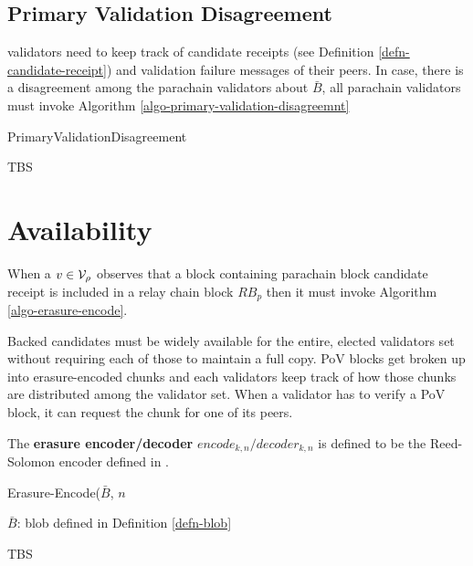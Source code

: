 

\subsection{Primary Validation Disagreement}
\label{sect-primary-validation-disagreemnt}
 validators need to keep track of candidate receipts
(see Definition \ref{defn-candidate-receipt}) and validation failure messages of
their peers. In case, there is a disagreement among the parachain validators
about $\bar{B}$, all parachain validators must invoke Algorithm
\ref{algo-primary-validation-disagreemnt}

\begin{algorithm}[H]
  \caption[]{\sc PrimaryValidationDisagreement}
  \label{algo-primary-validation-disagreemnt}
  \begin{algorithmic}[1]
    \Require{}

    \State TBS
  \end{algorithmic}
\end{algorithm}

\section{Availability}

When a $v \in \mathcal{V}_\rho$ observes that a block containing parachain block
candidate receipt is included in a relay chain block $RB_p$ then it must invoke
Algorithm \ref{algo-erasure-encode}.
\newline

Backed candidates must be widely available for the entire, elected validators
set without requiring each of those to maintain a full copy. PoV blocks get
broken up into erasure-encoded chunks and each validators keep track of how
those chunks are distributed among the validator set. When a validator has to
verify a PoV block, it can request the chunk for one of its peers.

\begin{definition}
  \label{defn-erasure-encoder-decoder}
  The {\bf erasure encoder/decoder} {\bf $encode_{k,n}/decoder_{k,n}$ } is
  defined to be the Reed-Solomon encoder defined in \cite{??}.
\end{definition}

\begin{algorithm}[H]
  \caption[]{\sc Erasure-Encode($\bar{B}$, $n$}
  \label{algo-erasure-encode}
  \begin{algorithmic}[1]
  \Require
    $\bar{B}$: blob defined in Definition \ref{defn-blob}

    \State TBS
  \end{algorithmic}
\end{algorithm}

